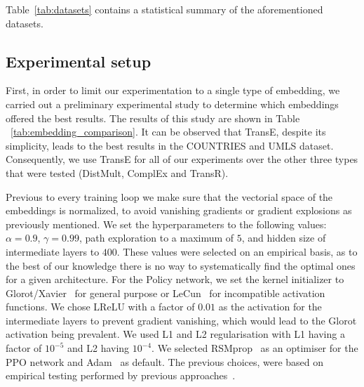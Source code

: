 Table~\ref{tab:datasets} contains a statistical summary of the aforementioned datasets.




\subsection{Experimental setup}


First, in order to limit our experimentation to a single type of embedding, we carried out a preliminary experimental study to determine which embeddings offered the best results. The results of this study are shown in Table ~\ref{tab:embedding_comparison}. It can be observed that TransE, despite its simplicity, leads to the best results in the COUNTRIES and UMLS dataset. Consequently, we use TransE for all of our experiments over the other three types that were tested (DistMult, ComplEx and TransR).

Previous to every training loop we make sure that the vectorial space of the embeddings is normalized, to avoid vanishing gradients or gradient explosions as previously mentioned. We set the hyperparameters to the following values: $\alpha=0.9$, $\gamma=0.99$, path exploration to a maximum of $5$, and hidden size of intermediate layers to $400$. These values were selected on an empirical basis, as to the best of our knowledge there is no way to systematically find the optimal ones for a given architecture.
For the Policy network, we set the kernel initializer to Glorot/Xavier~\cite{glorot2010understanding} for general purpose or LeCun~\cite{lecun2012efficient} for incompatible activation functions. We chose LReLU with a factor of $0.01$ as the activation for the intermediate layers to prevent gradient vanishing, which would lead to the Glorot activation being prevalent. We used L1 and L2 regularisation with L1 having a factor of $10^{-5}$ and L2 having $10^{-4}$. We selected RSMprop~\cite{hinton2012neural} as an optimiser for the PPO network and Adam~\cite{kingma2014adam} as default. The previous choices, were based on empirical testing performed by previous approaches~\cite{jomaa2019hyp}.



